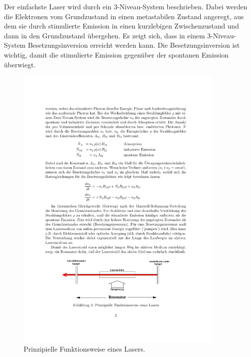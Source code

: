 Der einfachste Laser wird durch ein 3-Niveau-System beschrieben. Dabei werden
die Elektronen vom Grundzustand in einen metastabilen Zustand angeregt, aus dem
sie durch stimulierte Emission in einen kurzlebigen Zwischenzustand und dann in
den Grundzustand übergehen. Es zeigt sich, dass in einem 3-Niveau-System
Besetzungsinversion erreicht werden kann. Die Besetzungsinversion ist wichtig,
damit die stimulierte Emission gegenüber der spontanen Emission überwiegt.

\begin{figure}[htb]
  \centering
  \includegraphics[width=0.9\textwidth]{figures/fig_Resonator.pdf}
  \caption{Prinzipielle Funktionsweise eines Lasers.}
  \label{fig:Resonator}
\end{figure}

